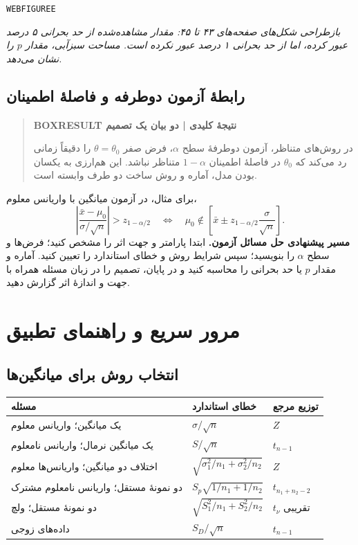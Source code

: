 \texttt{WEBFIGUREE}


\textit{بازطراحی شکل‌های صفحه‌های ۴۳ تا ۴۵: مقدار مشاهده‌شده از حد بحرانی ۵ درصد عبور کرده، اما از حد بحرانی ۱ درصد عبور نکرده است. مساحت سبزآبی، مقدار $p$ را نشان می‌دهد.}\par 

\section{رابطهٔ آزمون دوطرفه و فاصلهٔ اطمینان}
\begin{quote}\textbf{BOXRESULT نتیجهٔ کلیدی | دو بیان یک تصمیم}\par 
در روش‌های متناظر، آزمون دوطرفهٔ سطح $\alpha$، فرض صفر $\theta=\theta_0$ را دقیقاً زمانی رد می‌کند که $\theta_0$ در فاصلهٔ اطمینان $1-\alpha$ متناظر نباشد. این هم‌ارزی به یکسان بودن مدل، آماره و روش ساخت دو طرف وابسته است.
\end{quote}
برای مثال، در آزمون میانگین با واریانس معلوم،
\[
\left|\frac{\bar x-\mu_0}{\sigma/\sqrt n}\right|>z_{1-\alpha/2}
\quad\Longleftrightarrow\quad
\mu_0\notin\left[\bar x\pm z_{1-\alpha/2}\frac\sigma{\sqrt n}\right].
\]
\textbf{مسیر پیشنهادی حل مسائل آزمون.} ابتدا پارامتر و جهت اثر را مشخص کنید؛ فرض‌ها و سطح $\alpha$ را بنویسید؛ سپس شرایط روش و خطای استاندارد را تعیین کنید. آماره و مقدار $p$ یا حد بحرانی را محاسبه کنید و در پایان، تصمیم را در زبان مسئله همراه با جهت و اندازهٔ اثر گزارش دهید.


\chapter{مرور سریع و راهنمای تطبیق}

\section{انتخاب روش برای میانگین‌ها}


\begin{tabular}{l l l}
\toprule
مسئله & خطای استاندارد & توزیع مرجع\\
\midrule
یک میانگین؛ واریانس معلوم & $\sigma/\sqrt n$ & $Z$\\
یک میانگین نرمال؛ واریانس نامعلوم & $S/\sqrt n$ & $t_{n-1}$\\
اختلاف دو میانگین؛ واریانس‌ها معلوم & $\sqrt{\sigma_1^2/n_1+\sigma_2^2/n_2}$ & $Z$\\
دو نمونهٔ مستقل؛ واریانس نامعلوم مشترک & $S_p\sqrt{1/n_1+1/n_2}$ & $t_{n_1+n_2-2}$\\
دو نمونهٔ مستقل؛ ولچ & $\sqrt{S_1^2/n_1+S_2^2/n_2}$ & $t_\nu$ تقریبی\\
داده‌های زوجی & $S_D/\sqrt n$ & $t_{n-1}$\\
\bottomrule
\end{tabular}


